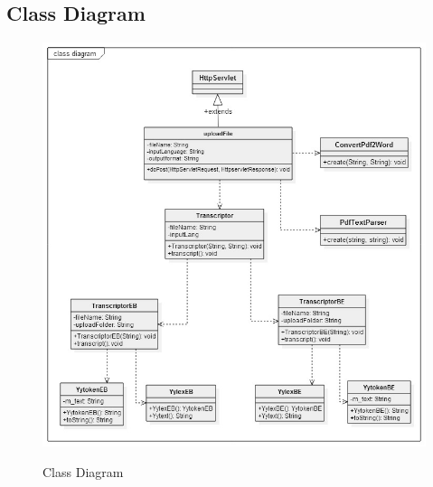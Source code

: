 \documentclass[12pt,oneside,openany,a4paper]{book}
\begin{document}
\subsection{Class Diagram}
\begin{figure}[H]
		\caption{Class Diagram}
		\centering
		\includegraphics[scale=0.58]{class}
		\label{fig:classdiagram}
\end{figure} 
\end{document}
